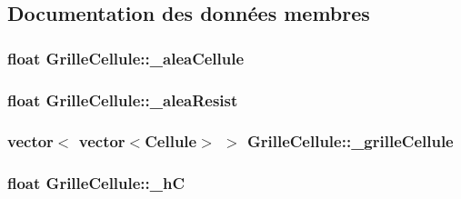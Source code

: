 \subsection{Documentation des données membres}
\hypertarget{classGrilleCellule_aedea07ae772e271fb5d1c9dc32cb72c0}{
\subsubsection[{\_\-aleaCellule}]{\setlength{\rightskip}{0pt plus 5cm}float {\bf GrilleCellule::\_\-aleaCellule}}}
\label{classGrilleCellule_aedea07ae772e271fb5d1c9dc32cb72c0}
\hypertarget{classGrilleCellule_ac4876d2ec29c0d509e6b17d8341ab1da}{
\subsubsection[{\_\-aleaResist}]{\setlength{\rightskip}{0pt plus 5cm}float {\bf GrilleCellule::\_\-aleaResist}}}
\label{classGrilleCellule_ac4876d2ec29c0d509e6b17d8341ab1da}
\hypertarget{classGrilleCellule_aca102f9c83e3f9554840db13cccc4501}{
\subsubsection[{\_\-grilleCellule}]{\setlength{\rightskip}{0pt plus 5cm}vector$<$ vector$<${\bf Cellule}$>$ $>$ {\bf GrilleCellule::\_\-grilleCellule}}}
\label{classGrilleCellule_aca102f9c83e3f9554840db13cccc4501}
\hypertarget{classGrilleCellule_a067c9dcebb4e62877b0015dec232bab1}{
\subsubsection[{\_\-hC}]{\setlength{\rightskip}{0pt plus 5cm}float {\bf GrilleCellule::\_\-hC}}}
